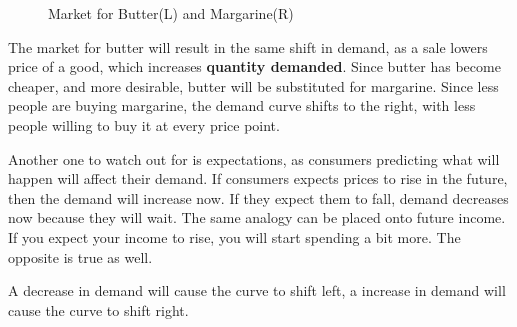 \begin{figure}[!h]
\begin{center}
\hspace*{-3cm}
\caption{Market for Butter(L) and Margarine(R)}
\label{fig:salsachips}
\end{center}
\end{figure}
The market for butter will result in the same shift in demand, as a sale lowers price of a good, which increases \textbf{quantity demanded}. Since butter has become cheaper, and more desirable, butter will be substituted for margarine. Since less people are buying margarine, the demand curve shifts to the right, with less people willing to buy it at every price point.

Another one to watch out for is expectations, as consumers predicting what will happen will affect their demand. If consumers expects prices to rise in the future, then the demand will increase now. If they expect them to fall, demand decreases now because they will wait. The same analogy can be placed onto future income. If you expect your income to rise, you will start spending a bit more. The opposite is true as well. 
\begin{definition}
    A decrease in demand will cause the curve to shift left, a increase in demand will cause the curve to shift right. 
\end{definition}
